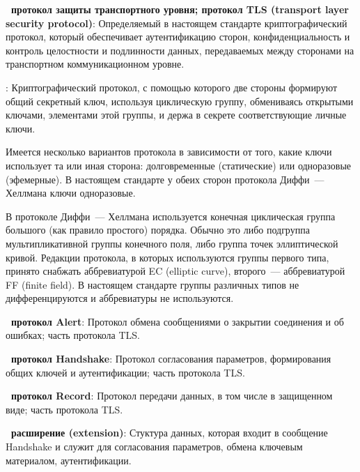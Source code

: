 {\bf \thedefctr~протокол защиты транспортного уровня; протокол TLS 
(transport layer security protocol)}: 
Определяемый в настоящем стандарте криптографический протокол, который
обеспечивает аутентификацию сторон, конфиденциальность и контроль целостности и
подлинности данных, передаваемых между сторонами на транспортном
коммуникационном уровне.

:
Криптографический протокол, с помощью которого две стороны формируют 
общий секретный ключ, используя циклическую группу, обмениваясь открытыми 
ключами, элементами этой группы, и держа в секрете соответствующие личные 
ключи. 

\begin{note}
Имеется несколько вариантов протокола в зависимости от того, какие ключи 
использует та или иная сторона: долговременные (статические) или 
одноразовые (эфемерные). В настоящем стандарте у обеих сторон протокола 
Диффи~--- Хеллмана ключи одноразовые.
\end{note}

\begin{note}
В протоколе Диффи~--- Хеллмана используется конечная циклическая группа большого
(как правило простого) порядка. Обычно это либо подгруппа мультипликативной
группы конечного поля, либо группа точек эллиптической кривой.
%
Редакции протокола, в которых используются группы первого типа, принято снабжать
аббревиатурой EC (elliptic curve), второго~--- аббревиатурой FF (finite field).
%
В настоящем стандарте группы различных типов не дифференцируются и аббревиатуры 
не используются.
\end{note}

{\bf \thedefctr~протокол Alert}:
Протокол обмена сообщениями о закрытии соединения и об ошибках;
часть протокола TLS.

{\bf \thedefctr~протокол Handshake}:
Протокол согласования параметров, формирования общих ключей и аутентификации; 
часть протокола TLS. 


{\bf \thedefctr~протокол Record}:
Протокол передачи данных, в том числе в защищенном виде; 
часть протокола TLS. 

{\bf \thedefctr~расширение (extension)}:
Стуктура данных, которая входит в сообщение Handshake и служит для 
согласования параметров, обмена ключевым материалом, аутентификации.

